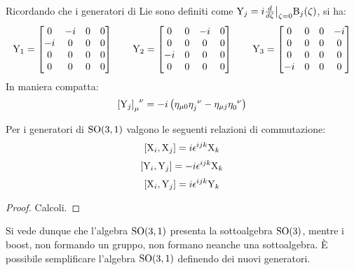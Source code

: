 Ricordando che i generatori di Lie sono definiti come $ \mathrm{Y}_j = i \frac{d}{d\zeta}\big\vert_{\zeta = 0} \mathrm{B}_j(\zeta) $, si ha:
\begin{equation*}
	\mathrm{Y}_1 =
	\begin{bmatrix}
		0 & -i & 0 & 0 \\
		-i & 0 & 0 & 0 \\
		0 & 0 & 0 & 0 \\
		0 & 0 & 0 & 0
	\end{bmatrix}
	\qquad
	\mathrm{Y}_2 =
	\begin{bmatrix}
		0 & 0 & -i & 0 \\
		0 & 0 & 0 & 0 \\
		-i & 0 & 0 & 0 \\
		0 & 0 & 0 & 0
	\end{bmatrix}
	\qquad
	\mathrm{Y}_3 =
	\begin{bmatrix}
		0 & 0 & 0 & -i \\
		0 & 0 & 0 & 0 \\
		0 & 0 & 0 & 0 \\
		-i & 0 & 0 & 0
	\end{bmatrix}
\end{equation*}
In maniera compatta:
\begin{equation}
	\tensor{\left[ \tens{Y}_j \right]}{_\mu^\nu} = -i \left( \eta_{\mu 0} \tensor{\eta}{_j^\nu} - \eta_{\mu j} \tensor{\eta}{_0^\nu} \right)
	\label{eq:10.22}
\end{equation}

\begin{proposition}
	Per i generatori di $ \mathrm{SO}(3,1) $ valgono le seguenti relazioni di commutazione:
	\begin{equation}
		\left[ \mathrm{X}_i, \mathrm{X}_j \right] = i \epsilon^{ijk} \mathrm{X}_k
		\label{eq:10.23}
	\end{equation}
	\begin{equation}
		\left[ \mathrm{Y}_i, \mathrm{Y}_j \right] = - i \epsilon^{ijk} \mathrm{X}_k
		\label{eq:10.24}
	\end{equation}
	\begin{equation}
		\left[ \mathrm{X}_i, \mathrm{Y}_j \right] = i \epsilon^{ijk} \mathrm{Y}_k
		\label{eq:10.25}
	\end{equation}
\end{proposition}
\begin{proof}
	Calcoli.
\end{proof}

Si vede dunque che l'algebra $ \mathrm{SO}(3,1) $ presenta la sottoalgebra $ \mathrm{SO}(3) $, mentre i boost, non formando un gruppo, non formano neanche una sottoalgebra. È possibile semplificare l'algebra $ \mathrm{SO}(3,1) $ definendo dei nuovi generatori.


